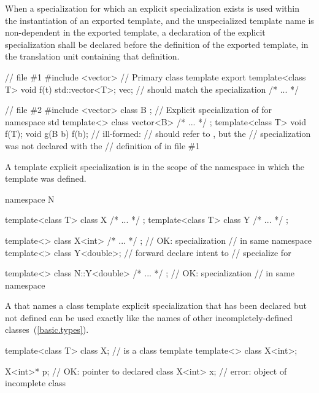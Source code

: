 \pnum
When a specialization for which an explicit specialization exists is used
within the instantiation of an exported template, and the unspecialized
template name is non-dependent in the exported template, a declaration
of the explicit specialization shall be declared before the definition of
the exported template, in the translation unit containing that definition.
\enterexample

\begin{codeblock}
// file \#1
#include <vector>
// Primary class template 
export template<class T> void f(t) {
	std::vector<T>; vec;	// should match the specialization
	/* ... */
}

// file \#2
#include <vector>
class B { };
// Explicit specialization of  for 
namespace std {
	template<> class vector<B> { /* ... */ };
}
template<class T> void f(T);
void g(B b) {
	f(b);			// ill-formed:
				//  should refer to , but the
				// specialization was not declared with the
				// definition of  in file \#1
}
\end{codeblock}
\exitexampleb

\pnum
A template explicit specialization is in the scope of the namespace in which
the template was defined.
\enterexample

\begin{codeblock}
namespace N {
	template<class T> class X { /* ... */ };
	template<class T> class Y { /* ... */ };

	template<> class X<int> { /* ... */ };    // OK: specialization
                                                // in same namespace
	template<> class Y<double>;             // forward declare intent to
                                                // specialize for 
}

template<> class N::Y<double> { /* ... */ };      // OK: specialization
                                                // in same namespace
\end{codeblock}
\exitexampleb

\pnum
A
that names a class template explicit specialization that has been declared but
not defined can be used exactly like the names of other incompletely-defined
classes~(\ref{basic.types}).
\enterexample

\begin{codeblock}
template<class T> class X;      //  is a class template
template<> class X<int>;

X<int>* p;                      // OK: pointer to declared class 
X<int> x;                       // error: object of incomplete class 
\end{codeblock}
\exitexampleb

